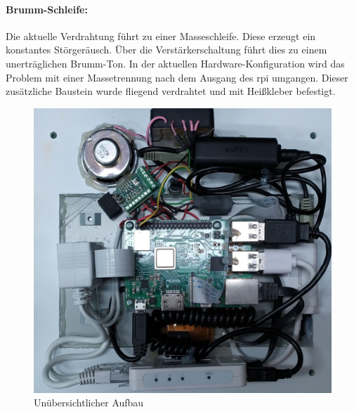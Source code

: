 \paragraph{Brumm-Schleife:} %
Die aktuelle Verdrahtung führt zu einer Masseschleife.
Diese erzeugt ein konstantes Störgeräusch.
Über die Verstärkerschaltung führt dies zu einem unerträglichen Brumm-Ton.
In der aktuellen Hardware-Konfiguration wird das Problem mit einer Massetrennung nach dem Ausgang des \ac{rpi} umgangen.
Dieser zusätzliche Baustein wurde fliegend verdrahtet und mit Heißkleber befestigt.

\begin{figure}[b!]
    \centering
    \includegraphics[width=.9\linewidth]{images/ist_situation/fliegender_aufbau.pdf}
    \caption{Unübersichtlicher Aufbau}
    \label{fig:iststand}
\end{figure}